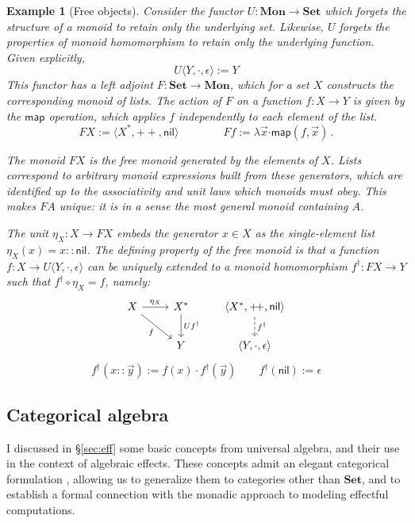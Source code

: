 \documentclass[11pt,oneside,draft]{book}
\newtheorem{example}[theorem]{Example}
\theoremstyle{definition}
\newcommand{\kw}[1]{\ensuremath{ \mathsf{#1} }}
\newcommand{\bdot}{\boldsymbol{\cdot}}
\begin{document}
\begin{example}[Free objects] %
Consider the functor $U : \mathbf{Mon} \rightarrow \mathbf{Set}$
which forgets the structure of a monoid
to retain only the underlying set.
Likewise,
$U$ forgets the properties of monoid homomorphism
to retain only the underlying function.
Given explicitly,
\[
  U \langle Y, {\cdot}, \epsilon \rangle := Y
\]
This functor has a left adjoint
$F : \mathbf{Set} \rightarrow \mathbf{Mon}$,
which for a set $X$
constructs the corresponding monoid of lists.
The action of $F$ on a function $f : X \rightarrow Y$
is given by the $\kw{map}$ operation,
which applies $f$ independently
to each element of the list.
\[
  F X := \langle X^*, {+\!+}, \kw{nil} \rangle
  \qquad \qquad
  F f := \lambda \vec{x} \bdot \kw{map}(f, \vec{x})
  \,.
\]

The monoid $F X$ is the \emph{free monoid}
generated by the elements of $X$.
Lists correspond to arbitrary monoid expressions
built from these generators,
which are identified up to
the associativity and unit laws
which monoids must obey.
This makes $F A$ unique:
it is in a sense the most general monoid
containing $A$.

The unit $\eta_X : X \rightarrow F X$
embeds the generator $x \in X$ as the single-element list
$\eta_X(x) = x :: \kw{nil}$.
The defining property of the free monoid is that
a function $f : X \rightarrow U \langle Y, {\cdot}, \epsilon \rangle$
can be uniquely extended to a monoid homomorphism
$f^\dagger : F X \rightarrow Y$
such that $f^\dagger \circ \eta_X = f$,
namely:
\[
  \begin{tikzcd}
    X \ar[r, "\eta_X"] \ar[dr, "f"'] &
    X^* \ar[d, "U f^\dagger"] &
    \langle X^*, {+\!+}, \kw{nil} \rangle
      \ar[d, "f^\dagger", dashed] \\ &
    Y &
    \langle Y, {\cdot}, \epsilon \rangle
  \end{tikzcd}
\]
\[
  f^\dagger(x :: \vec{y}) := f(x) \cdot f^\dagger(\vec{y})
  \qquad
  f^\dagger(\kw{nil}) := \epsilon
\]
\end{example}


\subsection{Categorical algebra} %

I discussed in \S\ref{sec:eff}
some basic concepts from universal algebra,
and their use in the context of algebraic effects.
These concepts admit
an elegant categorical formulation \citep{freemon},
allowing us to generalize them
to categories other than $\mathbf{Set}$,
and to establish a formal connection with
the monadic approach to modeling effectful computations.
\end{document}
